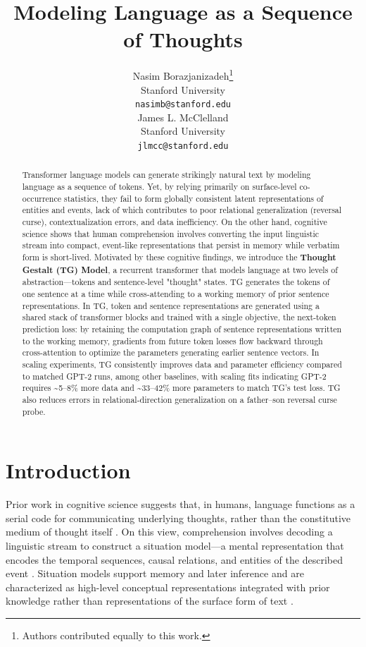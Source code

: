 \documentclass{article}
\title{Modeling Language as a Sequence of Thoughts}
\author{
  Nasim Borazjanizadeh\thanks{Authors contributed equally to this work.} \\
  Stanford University \\
  \texttt{nasimb@stanford.edu} \\
  \And
  James L. McClelland\footnotemark[1] \\
  Stanford University \\
  \texttt{jlmcc@stanford.edu}
}
\begin{document}
\maketitle
\vspace{-0.3cm}

\begin{abstract}
\vspace{-0.08cm}
Transformer language models can generate strikingly natural text by modeling language as a sequence of tokens. Yet, by relying primarily on surface-level co-occurrence statistics, they fail to form globally consistent latent representations of entities and events, lack of which contributes to poor relational generalization (reversal curse), contextualization errors, and data inefficiency. On the other hand, cognitive science shows that human comprehension involves converting the input linguistic stream into compact, event-like representations that persist in memory while verbatim form is short-lived. Motivated by these cognitive findings, we introduce the \textbf{Thought Gestalt (TG) Model}, a recurrent transformer that models language at two levels of abstraction—tokens and sentence-level "thought" states. TG generates the tokens of one sentence at a time while cross-attending to a working memory of prior sentence representations. In TG, token and sentence representations are generated using a shared stack of transformer blocks and trained with a single objective, the next-token prediction loss: by retaining the computation graph of sentence representations written to the working memory, gradients from future token losses flow backward through cross-attention to optimize the parameters generating earlier sentence vectors. In scaling experiments, TG consistently improves data and parameter efficiency compared to matched GPT-2 runs, among other baselines, with scaling fits indicating GPT-2 requires \textasciitilde5--8\% more data and \textasciitilde33--42\% more parameters to match TG's test loss. TG also reduces errors in relational-direction generalization on a father–son reversal curse probe.
\vspace{-0.1cm}
\end{abstract}


\section{Introduction}
\vspace{-0.1cm}

Prior work in cognitive science suggests that, in humans, language functions as a serial code for communicating underlying thoughts, rather than the constitutive medium of thought itself \citep{shank1972conceptual,mcclelland2020placing, fedorenko2024language,pinker1990natural}. On this view, comprehension involves decoding a linguistic stream to construct a situation model—a mental representation that encodes the temporal sequences, causal relations, and entities of the described event \citep{zwaan1998situation,glenberg1987mental}. Situation models support memory and later inference and are characterized as high-level conceptual representations integrated with prior knowledge rather than representations of the surface form of text \citep{zwaan1998situation,mcclelland2020placing}.
\end{document}
